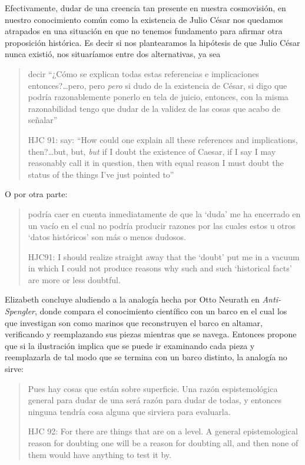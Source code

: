 Efectivamente, dudar de una creencia tan presente en nuestra cosmovisión, en nuestro conocimiento común como la existencia de Julio César nos quedamos atrapados en una situación en que no tenemos fundamento para afirmar otra proposición histórica. Es decir si nos plantearamos la hipótesis de que Julio César nunca existió, nos situaríamos entre dos alternativas, ya sea \blockquote[HJC 91: \textelp{} say: ``How could one explain all these references and implications, then?\ldots but, but, \emph{but} if I doubt the existence of Caesar, if I say I may reasonably call it in question, then with equal reason I must doubt the status of the things I've just pointed to'']{\textelp{} decir ``¿Cómo se explican todas estas referencias e implicaciones entonces?\ldots pero, pero \emph{pero} si dudo de la existencia de César, si digo que podría razonablemente ponerlo en tela de juicio, entonces, con la misma razonabilidad tengo que dudar de la validez de las cosas que acabo de señalar''}. O por otra parte: \blockquote[HJC91: \textelp{} I should realize straight away that the `doubt' put me in a vacuum in which I could not produce reasons why such and such `historical facts' are more or less doubtful.]{\textelp{} podría caer en cuenta inmediatamente de que la `duda' me ha encerrado en un vacío en el cual no podría producir razones por las cuales estos u otros `datos históricos' son más o menos dudosos.}

Elizabeth concluye aludiendo a la analogía hecha por Otto Neurath en \emph{Anti-Spengler}, donde compara el conocimiento científico con un barco en el cual los que investigan son como marinos que reconstruyen el barco en altamar, verificando y reemplazando sus piezas mientras que se navega. Entonces propone que si la ilustración implica que se puede ir examinando cada pieza y reemplazarla de tal modo que se termina con un barco distinto, la analogía no sirve: \blockquote[HJC 92: For there are things that are on a level. A general epistemological reason for doubting one will be a reason for doubting all, and then none of them would have anything to test it by.]{Pues hay cosas que están sobre superficie. Una razón espistemológica general para dudar de una será razón para dudar de todas, y entonces ninguna tendría cosa alguna que sirviera para evaluarla.}
